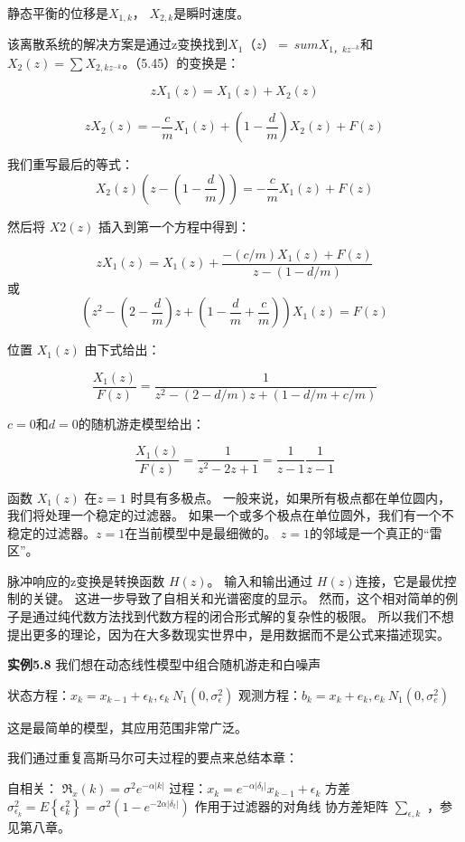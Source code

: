           静态平衡的位移是$ X_{1,k} $， $ X_{2,k} $是瞬时速度。
          
          该离散系统的解决方案是通过z变换找到$ X_ {1}（z）= \ sum X_ {1，kz ^ { - k}} $和 $ X_{2}(z)=\sum X_{2,kz^{-k}} $。（5.45）的变换是：
          
            \[ zX_{1}(z)=X_{1}(z)+X_{2}(z) \]
          
          \[ zX_{2}(z)=-\frac{c}{m}X_{1}(z)+(1-\frac{d}{m})X_{2}(z)+F(z) \]
          
          我们重写最后的等式：
          \[ X_{2}(z)(z-(1-\frac{d}{m}))=- \frac{c}{m} X_{1}(z)+F(z) \]
          
          
          然后将  $ X2(z) $  插入到第一个方程中得到：
          
           \[ zX_{1}(z)=X_{1}(z)+\frac{-(c/m)X_{1}(z)+F(z)}{z-(1-d/m)} \]
           或
           \[ (z^{2}-(2-\frac{d}{m})z+(1-\frac{d}{m}+\frac{c}{m}))X_{1}(z)=F(z) \]
           
           位置 $ X_{1}(z) $ 由下式给出：
           
            \[ \frac{X_{1}(z)}{F(z)}=\frac{1}{z^{2}-(2-d/m)z+(1-d/m+c/m)} \]
           
           $ c = 0 $和$ d = 0 $的随机游走模型给出：
           
           \[ \frac{X_{1}(z)}{F(z)}=\frac{1}{z^{2}-2z+1}=\frac{1}{z-1}\frac{1}{z-1} \]

           
           函数 $ X_{1}(z) $ 在$ z = 1 $ 时具有多极点。 一般来说，如果所有极点都在单位圆内，我们将处理一个稳定的过滤器。 如果一个或多个极点在单位圆外，我们有一个不稳定的过滤器。$ z = 1 $在当前模型中是最细微的。 $ z = 1 $的邻域是一个真正的“雷区”。
           
           脉冲响应的z变换是转换函数 $ H (z) $。 输入和输出通过  $ H (z) $连接，它是最优控制的关键。 这进一步导致了自相关和光谱密度的显示。 然而，这个相对简单的例子是通过纯代数方法找到代数方程的闭合形式解的复杂性的极限。 所以我们不想提出更多的理论，因为在大多数现实世界中，是用数据而不是公式来描述现实。
           
           \textbf{实例5.8} 我们想在动态线性模型中组合随机游走和白噪声
           
           状态方程：$ x_{k}=x_{k-1}+\epsilon_{k},\epsilon_{k}~N_{1}(0,\sigma_{\epsilon}^{2})$
           观测方程：$ b_{k}=x_{k}+e_{k},e_{k}~N_{1}(0,\sigma_{e}^{2}) $
           
           这是最简单的模型，其应用范围非常广泛。
           
           我们通过重复高斯马尔可夫过程的要点来总结本章：
           
           自相关： $ \Re_{x}(k)=\sigma^{2}e^{-\alpha|k|} $
           过程：$ x_{k}=e^{-\alpha|\delta_{t}|}x_{k-1}+\epsilon_{k} $
           方差 $ \sigma_{\epsilon_{k}}^{2}=E\left\lbrace \epsilon_{k}^{2} \right\rbrace =\sigma^{2}(1-e^{-2\alpha|\delta_{t}|})$ 作用于过滤器的对角线
           协方差矩阵 $ \sum\nolimits_{\epsilon,k} $ ，参见第八章。
           
           
          
          
       
       
       
       
       
       

